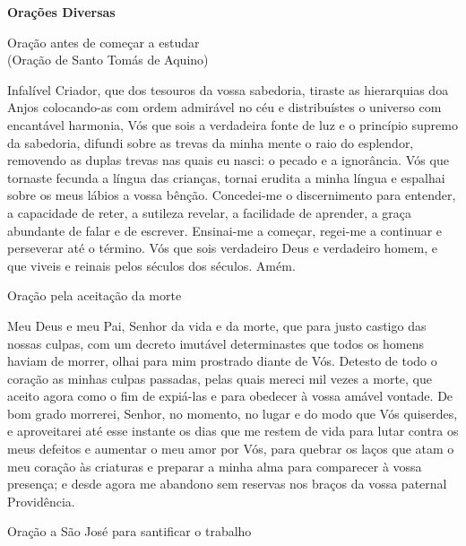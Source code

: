 \newpage
\begin{center}
    \textbf{Orações Diversas}
\end{center}
\begin{center}
    Oração antes de começar a estudar \\ \textcolor{VioletRed3}{\scriptsize{(Oração de Santo Tomás de Aquino)}}
\end{center}
\begin{flushleft}
    Infalível Criador, que dos tesouros da vossa sabedoria, tiraste as hierarquias doa Anjos colocando-as com ordem admirável no céu e distribuístes o universo com encantável harmonia, Vós que sois a verdadeira fonte de luz e o princípio supremo da sabedoria, difundi sobre as trevas da minha mente o raio do esplendor, removendo as duplas trevas nas quais eu nasci: o pecado e a ignorância. Vós que tornaste fecunda a língua das crianças, tornai erudita a minha língua e espalhai sobre os meus lábios a vossa bênção. Concedei-me o discernimento para entender, a capacidade de reter, a sutileza revelar, a facilidade de aprender, a graça abundante de falar e de escrever. Ensinai-me a começar, regei-me a continuar e perseverar até o término. Vós que sois verdadeiro Deus e verdadeiro homem, e que viveis e reinais pelos séculos dos séculos. Amém.
\end{flushleft}
\begin{center}
    Oração pela aceitação da morte
\end{center}
\begin{flushleft}
    Meu Deus e meu Pai, Senhor da vida e da morte, que para justo castigo das nossas culpas, com um decreto imutável determinastes que todos os homens haviam de morrer, olhai para mim prostrado diante de Vós. Detesto de todo o coração as minhas culpas passadas, pelas quais mereci mil vezes a morte, que aceito agora como o fim de expiá-las e para obedecer à vossa amável vontade. De bom grado morrerei, Senhor, no momento, no lugar e do modo que Vós quiserdes, e aproveitarei até esse instante os dias que me restem de vida para lutar contra os meus defeitos e aumentar o meu amor por Vós, para quebrar os laços que atam o meu coração às criaturas e preparar a minha alma para comparecer à vossa presença; e desde agora me abandono sem reservas nos braços da vossa paternal Providência.
\end{flushleft}
\newpage
\begin{center}
    Oração a São José para santificar o trabalho
\end{center}
